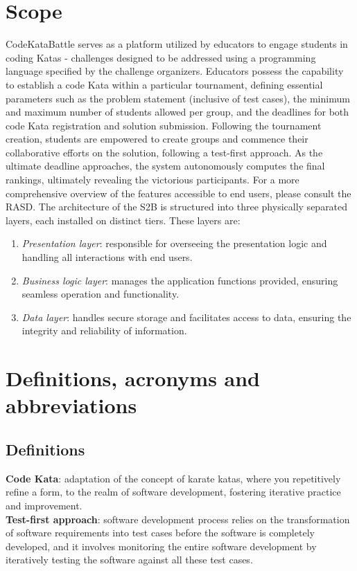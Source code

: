 \documentclass[12pt, a4paper]{report}
\begin{document}
    \section{Scope}
    CodeKataBattle serves as a platform utilized by educators to engage students in coding Katas - challenges designed to be addressed using a programming language specified by the challenge organizers. 
    Educators possess the capability to establish a code Kata within a particular tournament, defining essential parameters such as the problem statement (inclusive of test cases), 
    the minimum and maximum number of students allowed per group, and the deadlines for both code Kata registration and solution submission.
    Following the tournament creation, students are empowered to create groups and commence their collaborative efforts on the solution, following a test-first approach. 
    As the ultimate deadline approaches, the system autonomously computes the final rankings, ultimately revealing the victorious participants.
    For a more comprehensive overview of the features accessible to end users, please consult the RASD. 
    The architecture of the S2B is structured into three physically separated layers, each installed on distinct tiers. 
    These layers are:
    \begin{enumerate}
        \item \textit{Presentation layer}: responsible for overseeing the presentation logic and handling all interactions with end users.
        \item \textit{Business logic layer}: manages the application functions provided, ensuring seamless operation and functionality.
        \item \textit{Data layer}: handles secure storage and facilitates access to data, ensuring the integrity and reliability of information.
    \end{enumerate}

    \section{Definitions, acronyms and abbreviations}
    \subsection{Definitions}
    \textbf{Code Kata}: adaptation of the concept of karate katas, where you repetitively refine a form, to the realm of software development, 
        fostering iterative practice and improvement. 
    \\
    \textbf{Test-first approach}:  software development process relies on the transformation of software requirements into test cases before 
        the software is completely developed, and it involves monitoring the entire software development by iteratively testing the software 
        against all these test cases.
\end{document}
